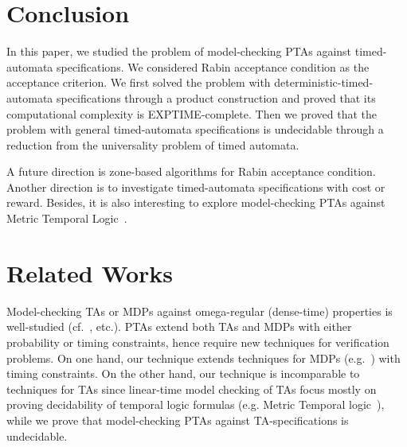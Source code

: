 \vspace{-1.8em}
\section{Conclusion}
\vspace{-1em}

In this paper, we studied the problem of model-checking PTAs against timed-automata specifications.
We considered Rabin acceptance condition as the acceptance criterion.
We first solved the problem with deterministic-timed-automata specifications through a product construction and proved that its computational complexity is EXPTIME-complete.
Then we proved that the problem with general timed-automata specifications is undecidable through a reduction from the universality problem of timed automata.

A future direction is zone-based algorithms for Rabin acceptance condition.
Another direction is to investigate timed-automata specifications with cost or reward.
Besides, it is also interesting to explore model-checking PTAs against Metric Temporal Logic~\cite{DBLP:journals/rts/Koymans90}.

\vspace{-1.8em}
\section{Related Works}
\vspace{-1em}

Model-checking TAs or MDPs against omega-regular (dense-time) properties is well-studied (cf.~\cite{DBLP:books/daglib/0020348,DBLP:conf/lics/OuaknineW05,DBLP:conf/arts/Vardi99}, etc.).
PTAs extend both TAs and MDPs with either probability or timing constraints,
hence require new techniques for verification problems.
On one hand, our technique extends techniques for MDPs (e.g.~\cite{DBLP:conf/arts/Vardi99}) with timing constraints.
On the other hand, our technique is incomparable to techniques for TAs since linear-time model checking of TAs focus mostly on proving decidability of temporal logic formulas (e.g. Metric Temporal logic~\cite{DBLP:journals/rts/Koymans90,DBLP:journals/jacm/AlurFH96,DBLP:conf/lics/OuaknineW05}),
while we prove that model-checking PTAs against TA-specifications is undecidable.

